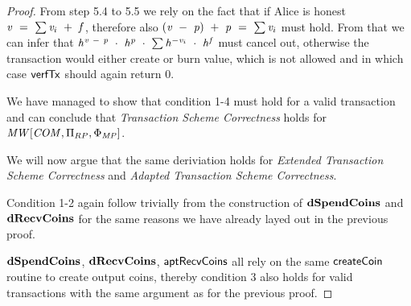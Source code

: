 \begin{proof}
    From step 5.4 to 5.5 we rely on the fact that if Alice is honest $\mathit{v} ~=~ \sum \mathit{v}_i ~+~ \mathit{f}$, therefore also $(\mathit{v} ~-~ \mathit{p}) ~+~ \mathit{p} ~=~ \sum \mathit{v}_i$ must hold.
    From that we can infer that $\mathit{h}^{\mathit{v} ~-~ \mathit{p}} ~\cdot~ \mathit{h}^{\mathit{p}} ~\cdot~ \sum \mathit{h}^{- \mathit{v}_i} ~\cdot~ \mathit{h}^{\mathit{f}}$ must cancel out, otherwise the transaction would either create or burn value, which is not allowed and in which case $\mathsf{verfTx}$ should again return 0.

    We have managed to show that condition 1-4 must hold for a valid transaction and can conclude that \emph{Transaction Scheme Correctness} holds for $\mathit{MW}[\mathit{COM},\Pi_{RP},\Phi_{\mathit{MP}}]$.

    We will now argue that the same deriviation holds for \emph{Extended Transaction Scheme Correctness} and \emph{Adapted Transaction Scheme Correctness}.

    Condition 1-2 again follow trivially from the construction of $\mathbf{dSpendCoins}$ and \\$\mathbf{dRecvCoins}$ for the same reasons we have already layed out in the previous proof.

    $\mathbf{dSpendCoins}$, $\mathbf{dRecvCoins}$, $\mathsf{aptRecvCoins}$ all rely on the same $\mathsf{createCoin}$ routine to create output coins, thereby condition 3 also holds for valid transactions with the same argument as for the previous proof.


\end{proof}
